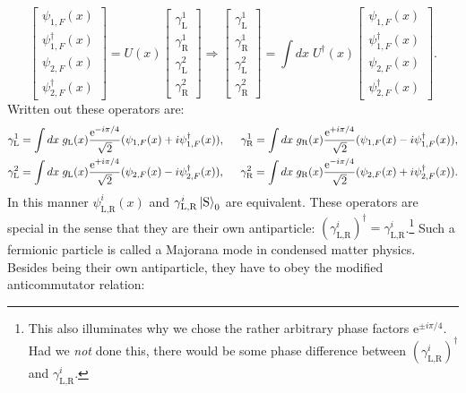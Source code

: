 \begin{equation}
\begin{bmatrix} \psi_{1,F}(x) \\ \psi_{1,F}^\dagger(x) \\ \psi_{2,F}(x) \\ \psi_{2,F}^\dagger(x) \end{bmatrix} = U(x) \begin{bmatrix} \gamma^{1}_{\text{L}} \\ \gamma^{1}_{\text{R}} \\ \gamma^{2}_{\text{L}} \\ \gamma^{2}_{\text{R}} \end{bmatrix} \Rightarrow \begin{bmatrix} \gamma^{1}_{\text{L}} \\ \gamma^{1}_{\text{R}} \\ \gamma^{2}_{\text{L}} \\ \gamma^{2}_{\text{R}} \end{bmatrix} = \int dx \; U^\dagger(x) \begin{bmatrix} \psi_{1,F}(x) \\ \psi_{1,F}^\dagger(x) \\ \psi_{2,F}(x) \\ \psi_{2,F}^\dagger(x) \end{bmatrix}.
\label{eq.Majoranaedgemodedef} 
\end{equation} 
Written out these operators are: 
\begin{align}
\gamma^1_{\text{L}} &= \int dx \; g_{\text{L}}(x)\frac{\text{e}^{-i\pi/4}}{\sqrt{2}}(\psi_{1,F}(x) + i\psi^\dagger_{1,F}(x)), \hspace{0.5cm} \gamma^1_{\text{R}} = \int dx \; g_{\text{R}}(x)\frac{\text{e}^{+i\pi/4}}{\sqrt{2}}(\psi_{1,F}(x) - i\psi^\dagger_{1,F}(x)), \nonumber \\
\gamma^2_{\text{L}} &= \int dx \; g_{\text{L}}(x)\frac{\text{e}^{+i\pi/4}}{\sqrt{2}}(\psi_{2,F}(x) - i\psi^\dagger_{2,F}(x)), \hspace{0.5cm} \gamma^2_{\text{R}} = \int dx \; g_{\text{R}}(x)\frac{\text{e}^{-i\pi/4}}{\sqrt{2}}(\psi_{2,F}(x) + i \psi^\dagger_{2,F}(x)). \nonumber 
\end{align}
In this manner $\psi^{i}_{\text{L,R}}(x)$ and $\gamma^{i}_{\text{L,R}}\ket{\text{S}}_0$ are equivalent. These operators are special in the sense that they are their own antiparticle: $\left(\gamma^{i}_{\text{L,R}}\right)^\dagger = \gamma^{i}_{\text{L,R}}$.\footnote{This also illuminates why we chose the rather arbitrary phase factors $\text{e}^{\pm i\pi/4}$. Had we \textit{not} done this, there would be some phase difference between $\left(\gamma^{i}_{\text{L,R}}\right)^\dagger$ and $\gamma^{i}_{\text{L,R}}$.} Such a fermionic particle is called a Majorana mode in condensed matter physics. Besides being their own antiparticle, they have to obey the modified anticommutator relation:

